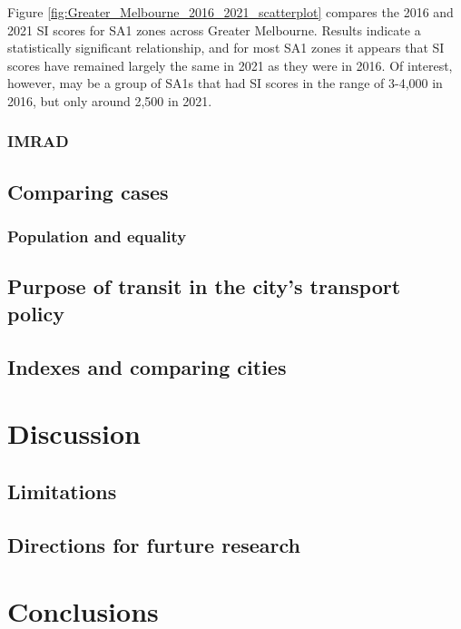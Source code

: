 \documentclass[preprint, 3p,
authoryear]{elsarticle} %
\begin{document}
Figure \ref{fig:Greater_Melbourne_2016_2021_scatterplot} compares the
2016 and 2021 SI scores for SA1 zones across Greater Melbourne. Results
indicate a statistically significant relationship, and for most SA1
zones it appears that SI scores have remained largely the same in 2021
as they were in 2016. Of interest, however, may be a group of SA1s that
had SI scores in the range of 3-4,000 in 2016, but only around 2,500 in
2021.

\hypertarget{imrad}{%
\subsubsection{IMRAD}\label{imrad}}

\hypertarget{comparing-cases}{%
\subsection{Comparing cases}\label{comparing-cases}}

\hypertarget{population-and-equality}{%
\subsubsection{Population and equality}\label{population-and-equality}}

\hypertarget{purpose-of-transit-in-the-citys-transport-policy}{%
\subsection{Purpose of transit in the city's transport
policy}\label{purpose-of-transit-in-the-citys-transport-policy}}

\hypertarget{indexes-and-comparing-cities}{%
\subsection{Indexes and comparing
cities}\label{indexes-and-comparing-cities}}

\hypertarget{discussion}{%
\section{Discussion}\label{discussion}}

\hypertarget{limitations}{%
\subsection{Limitations}\label{limitations}}

\hypertarget{directions-for-furture-research}{%
\subsection{Directions for furture
research}\label{directions-for-furture-research}}

\hypertarget{conclusions}{%
\section{Conclusions}\label{conclusions}}

\renewcommand\refname{References}

\end{document}
